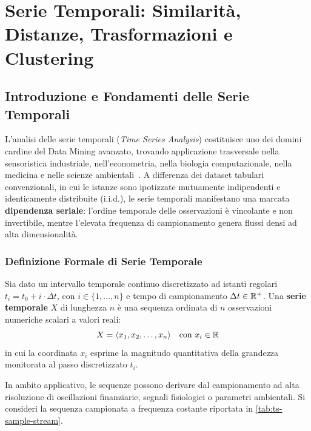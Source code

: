 \chapter{Serie Temporali: Similarit\`a, Distanze, Trasformazioni e Clustering}
\label{chap:dm-time-series}

\FloatBarrier
\section{Introduzione e Fondamenti delle Serie Temporali}
\label{sec:ts-intro-foundations}

L'analisi delle serie temporali (\textit{Time Series Analysis}) costituisce uno dei domini cardine del Data Mining avanzato, trovando applicazione trasversale nella sensoristica industriale, nell'econometria, nella biologia computazionale, nella medicina e nelle scienze ambientali~\cite{tan2018, hyndman2018}. A differenza dei dataset tabulari convenzionali, in cui le istanze sono ipotizzate mutuamente indipendenti e identicamente distribuite (i.i.d.), le serie temporali manifestano una marcata \textbf{dipendenza seriale}: l'ordine temporale delle osservazioni \`e vincolante e non invertibile, mentre l'elevata frequenza di campionamento genera flussi densi ad alta dimensionalit\`a.

\FloatBarrier
\subsection{Definizione Formale di Serie Temporale}
\label{subsec:ts-formal-definition}

\begin{definition}
\label{def:time-series}
Sia dato un intervallo temporale continuo discretizzato ad istanti regolari $t_i = t_0 + i \cdot \Delta t$, con $i \in \{1, \dots, n\}$ e tempo di campionamento $\Delta t \in \mathbb{R}^+$. Una \textbf{serie temporale} $X$ di lunghezza $n$ \`e una sequenza ordinata di $n$ osservazioni numeriche scalari a valori reali:
\begin{equation}
\label{eq:ts-vector-def}
X = \langle x_1, x_2, \dots, x_n \rangle \quad \text{con } x_i \in \mathbb{R}
\end{equation}
in cui la coordinata $x_i$ esprime la magnitudo quantitativa della grandezza monitorata al passo discretizzato $t_i$.
\end{definition}

In ambito applicativo, le sequenze possono derivare dal campionamento ad alta risoluzione di oscillazioni finanziarie, segnali fisiologici o parametri ambientali. Si consideri la sequenza campionata a frequenza costante riportata in \autoref{tab:ts-sample-stream}.

